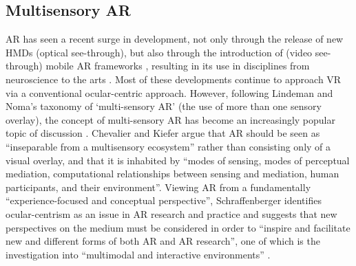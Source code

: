 \subsection{Multisensory AR}                    \label{sec: area-literature-msar}
AR has seen a recent surge in development, not only through the release of new HMDs (optical see-through), but also through the introduction of (video see-through) mobile AR frameworks \citep{apple2020,google2020,vuforia2020}, resulting in its use in disciplines from neuroscience \citep{mcduff2017} to the arts \citep{eliasson2020}. Most of these developments continue to approach VR via a conventional ocular-centric approach. However, following Lindeman and Noma’s \citeyearpar{lindeman2007} taxonomy of ‘multi-sensory AR’ (the use of more than one sensory overlay), the concept of multi-sensory AR has become an increasingly popular topic of discussion \citep{billinghurst2015,schraffenberger2016,papagiannis2014}. Chevalier and Kiefer \citeyearpar{chevalier2018} argue that AR should be seen as “inseparable from a multisensory ecosystem” rather than consisting only of a visual overlay, and that it is inhabited by “modes of sensing, modes of perceptual mediation, computational relationships between sensing and mediation, human participants, and their environment”. Viewing AR from a fundamentally “experience-focused and conceptual perspective”, Schraffenberger identifies ocular-centrism as an issue in AR research and practice and suggests that new perspectives on the medium must be considered in order to “inspire and facilitate new and different forms of both AR and AR research”, one of which is the investigation into “multimodal and interactive environments” \citeyearpar{schraffenberger2018}.

